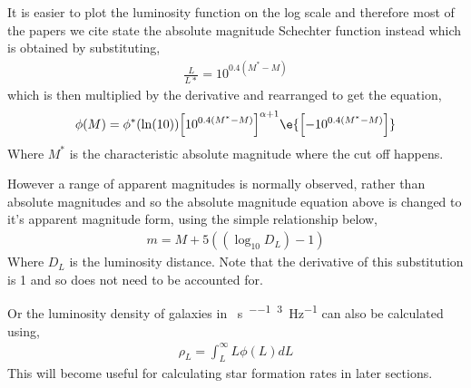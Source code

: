 	It is easier to plot the luminosity function on the log scale and therefore most of the papers we cite state the absolute magnitude Schechter function instead which is obtained by substituting,
	\begin{align}
		\frac{L}{L*}=10^{0.4(M^{*}-M)}
	\end{align}
	which is then multiplied by the derivative and rearranged to get the equation,
	\begin{align}
		\phi(M)=\phi^{*}(\ln(10)){\left[10^{0.4(M^{*}-M)}\right]}^{\alpha+1}\e{\left[-10^{0.4(M^{*}-M)}\right]}
	\end{align}
	Where $M^{*}$ is the characteristic absolute magnitude where the cut off happens.

	However a range of apparent magnitudes is normally observed, rather than absolute magnitudes and so the absolute magnitude equation above is changed to it's apparent magnitude form, using the simple relationship below,
	\begin{align}
		m=M+5((\log_{10}D_{L})-1)
	\end{align}
	Where $D_{L}$ is the luminosity distance. Note that the derivative of this substitution is 1 and so does not need to be accounted for.

	Or the luminosity density of galaxies in \si{\erg\per\second\per\mega\parsec\cubed\per\hertz} can also be calculated using,
	\begin{align}
		\rho_{L}=\int^{\infty}_{L}L\phi(L)dL
	\end{align}
	This will become useful for calculating star formation rates in later sections.
